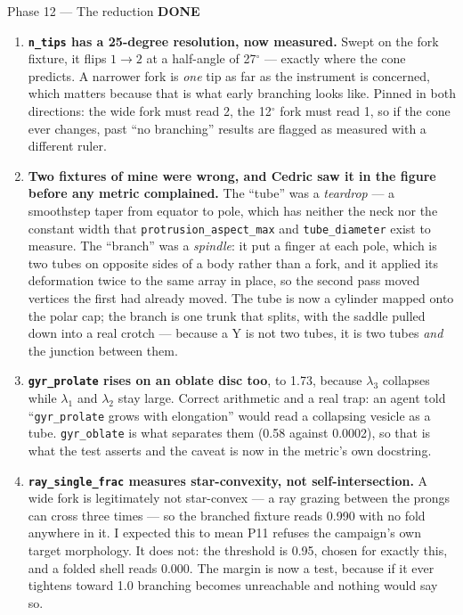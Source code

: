 \documentclass[11pt,a4paper]{article}
\newcommand{\code}[1]{\texttt{#1}}
\newcommand{\done}{\textcolor{good}{\textbf{DONE}}}
\begin{document}
\begin{phasebox}{Phase 12 --- The reduction \hfill \done}
\begin{enumerate}
\item \textbf{\code{n\_tips} has a 25-degree resolution, now measured.} Swept on the fork fixture, it
flips $1\to2$ at a half-angle of 27$^\circ$ --- exactly where the cone predicts. A narrower fork is
\emph{one} tip as far as the instrument is concerned, which matters because that is what early
branching looks like. Pinned in both directions: the wide fork must read 2, the 12$^\circ$ fork must
read 1, so if the cone ever changes, past ``no branching'' results are flagged as measured with a
different ruler.

\item \textbf{Two fixtures of mine were wrong, and Cedric saw it in the figure before any metric
complained.} The ``tube'' was a \emph{teardrop} --- a smoothstep taper from equator to pole, which has
neither the neck nor the constant width that \code{protrusion\_aspect\_max} and \code{tube\_diameter}
exist to measure. The ``branch'' was a \emph{spindle}: it put a finger at each pole, which is two tubes
on opposite sides of a body rather than a fork, and it applied its deformation twice to the same array
in place, so the second pass moved vertices the first had already moved. The tube is now a cylinder
mapped onto the polar cap; the branch is one trunk that splits, with the saddle pulled down into a real
crotch --- because a Y is not two tubes, it is two tubes \emph{and} the junction between them.

\item \textbf{\code{gyr\_prolate} rises on an oblate disc too}, to 1.73, because $\lambda_3$ collapses
while $\lambda_1$ and $\lambda_2$ stay large. Correct arithmetic and a real trap: an agent told
``\code{gyr\_prolate} grows with elongation'' would read a collapsing vesicle as a tube.
\code{gyr\_oblate} is what separates them (0.58 against 0.0002), so that is what the test asserts and
the caveat is now in the metric's own docstring.

\item \textbf{\code{ray\_single\_frac} measures star-convexity, not self-intersection.} A wide fork is
legitimately not star-convex --- a ray grazing between the prongs can cross three times --- so the
branched fixture reads 0.990 with no fold anywhere in it. I expected this to mean P11 refuses the
campaign's own target morphology. It does not: the threshold is 0.95, chosen for exactly this, and a
folded shell reads 0.000. The margin is now a test, because if it ever tightens toward 1.0 branching
becomes unreachable and nothing would say so.


\end{enumerate}
\end{phasebox}
\end{document}
